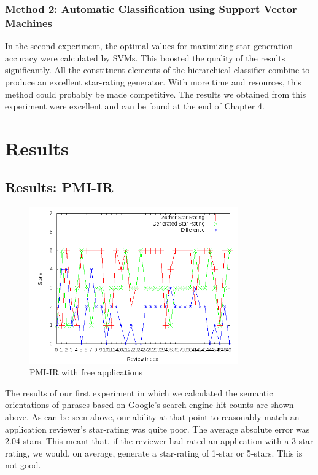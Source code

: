 \documentclass[11pt]{report} %
\begin{document}
	\subsection{Method 2: Automatic Classification using Support Vector Machines}

In the second experiment, the optimal values for maximizing star-generation accuracy were calculated by SVMs. This boosted the quality of the results significantly. All the constituent elements of the hierarchical classifier combine to produce an excellent star-rating generator. With more time and resources, this method could probably be made competitive. The results we obtained from this experiment were excellent and can be found at the end of Chapter 4.



\chapter{Results}
\label{chapter:results}
	\section{Results: PMI-IR}

	\begin{figure}[H]
	\centering
	\includegraphics[width=0.8\textwidth]{data/pmi-free.png}
	\caption{PMI-IR with free applications}
	\label{fig:pmi-free}
	\end{figure}

The results of our first experiment in which we calculated the semantic orientations of phrases based on Google's search engine hit counts are shown above. As can be seen above, our ability at that point to reasonably match an application reviewer's star-rating was quite poor. The average absolute error was 2.04 stars. This meant that, if the reviewer had rated an application with a 3-star rating, we would, on average, generate a star-rating of 1-star or 5-stars. This is not good.
\end{document}
